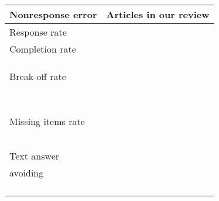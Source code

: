 \begin{table}
    \centering
	\begin{tabular}{ll}
		\toprule
		Nonresponse error & Articles in our review\\
		\midrule
		Response rate & \cite{lambert_living_2015, tourangeau_web_2018}\\
        Completion rate & \cite{ha_are_2019, ha_data_2020}\\
    	& \cite{mavletova_data_2013, mavletova_grid_2018}\\
    	& \cite{ buskirk_making_2014}\\
    	& \cite{mavletova_sensitive_2013}\\
        Break-off rate & \cite{erens_comparing_2019, mavletova_data_2013}\\
    	& \cite{hartman_does_2019, liebe_does_2015}\\
    	& \cite{lee_experimental_2019, mavletova_grid_2018}\\
    	& \cite{lambert_living_2015}\\
    	& \cite{bosch_measurement_2019}\\
    	& \cite{schlosser_mobile_2018, brosnan_pc_2017}\\
    	& \cite{mavletova_sensitive_2013, keusch_web_2017}\\
    	& \cite{toepoel_what_2014, steinbrecher_why_2015}\\
    	& \cite{couper_why_2017}\\
        Missing items rate & \cite{revilla_are_2017, erens_comparing_2019}\\
    	& \cite{revilla_comparing_2018, lee_experimental_2019}\\
    	& \cite{buskirk_making_2014, daikeler_motivated_2020}\\
    	& \cite{toepoel_sliders_2018, struminskaya_effects_2015}\\
    	& \cite{lugtig_use_2016, tourangeau_web_2018}\\
    	& \cite{keusch_web_2017}\\
    	Text answer & \cite{erens_comparing_2019, wells_comparison_2014}\\
    	avoiding & \cite{ha_data_2020, antoun_effects_2017}\\
    	& \cite{de_bruijne_improving_2014}\\
    	& \cite{schlosser_mobile_2018}\\
    	& \cite{revilla_open_2016, struminskaya_effects_2015}\\
    	& \cite{toepoel_what_2014}\\

\end{tabular}
\end{table}

